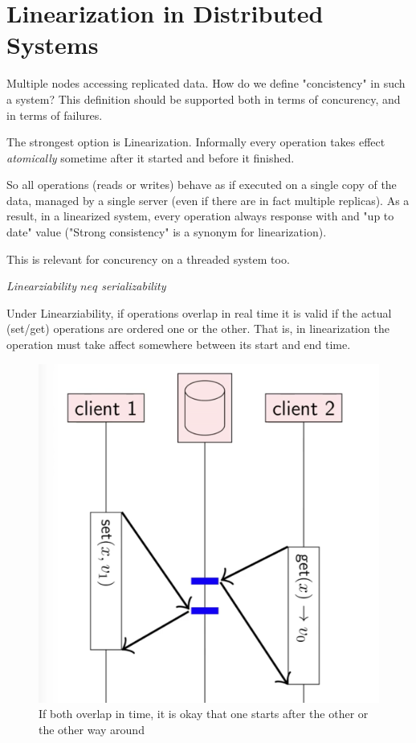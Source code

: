 \section{Linearization in Distributed Systems}
Multiple nodes accessing replicated data.
How do we define "concistency" in such a system?
This definition should be supported both in terms of concurency, and in terms of failures.

The strongest option is Linearization.
Informally every operation takes effect \emph{atomically}
sometime after it started and before it finished.

So all operations (reads or writes) behave as if executed on a single copy of
the data, managed by a single server (even if there are in fact multiple replicas).
As a result, in a linearized system, every operation always response 
with and "up to date" value ("Strong consistency" is a synonym for linearization).

This is relevant for concurency on a threaded system too.

\emph{Linearziability $neq$ serializability}


Under Linearziability, if operations overlap in real time 
it is valid if the actual (set/get) operations are ordered one or the other.
That is, in linearization the operation must take affect somewhere between
its start and end time.
 
 \begin{figure}[t]
        \centering
        \includegraphics[scale=0.25]{computer-sceince/distributed-media/linearization.png}
        \caption{ If both overlap in time, it is okay that one starts after the other or the other way around
        }
\end{figure}

